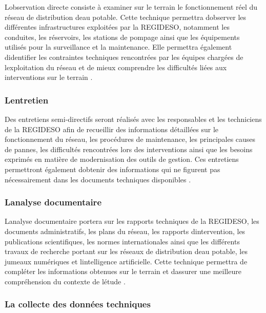 L\textquotesingle observation directe consiste à examiner sur le terrain
le fonctionnement réel du réseau de distribution d\textquotesingle eau
potable. Cette technique permettra d\textquotesingle observer les
différentes infrastructures exploitées par la REGIDESO, notamment les
conduites, les réservoirs, les stations de pompage ainsi que les
équipements utilisés pour la surveillance et la maintenance. Elle
permettra également d\textquotesingle identifier les contraintes
techniques rencontrées par les équipes chargées de
l\textquotesingle exploitation du réseau et de mieux comprendre les
difficultés liées aux interventions sur le terrain \cite{ref110}.

\subsubsection{L\textquotesingle entretien}\label{b-lentretien}

Des entretiens semi-directifs seront réalisés avec les responsables et
les techniciens de la REGIDESO afin de recueillir des informations
détaillées sur le fonctionnement du réseau, les procédures de
maintenance, les principales causes de pannes, les difficultés
rencontrées lors des interventions ainsi que les besoins exprimés en
matière de modernisation des outils de gestion. Ces entretiens
permettront également d\textquotesingle obtenir des informations qui ne
figurent pas nécessairement dans les documents techniques disponibles
\cite{ref104}.

\subsubsection{L\textquotesingle analyse
	documentaire}\label{c-lanalyse-documentaire}

L\textquotesingle analyse documentaire portera sur les rapports
techniques de la REGIDESO, les documents administratifs, les plans du
réseau, les rapports d\textquotesingle intervention, les publications
scientifiques, les normes internationales ainsi que les différents
travaux de recherche portant sur les réseaux de distribution
d\textquotesingle eau potable, les jumeaux numériques et
l\textquotesingle intelligence artificielle. Cette technique permettra
de compléter les informations obtenues sur le terrain et
d\textquotesingle assurer une meilleure compréhension du contexte de
l\textquotesingle étude \cite{ref81}.

\subsubsection{La collecte des données
	techniques}\label{d-la-collecte-des-donnuxe9es-techniques}

